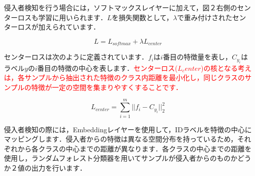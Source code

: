 \documentclass[dvipdfmx]{jsarticle}
\begin{document}
\begin{enumerate}
侵入者検知を行う場合には，ソフトマックスレイヤーに加えて，図２右側のセンターロスも学習に用いられます．$L$を損失関数として，$\lambda$で重み付けされたセンターロスが加えられています．

\begin{equation}
L = L_{softmax} + \lambda L_{center}
\end{equation}

センターロスは次のように定義されています．$f_i$は$i$番目の特徴量を表し，$C_{y_i}$はラベル$y$の$i$番目の特徴の中心を表します．\textcolor{red}{センターロス($L_center$)の核となる考えは，各サンプルから抽出された特徴のクラス内距離を最小化し，同じクラスのサンプルの特徴が一定の空間を集まりやすくすることです．}

\begin{equation}\label{}
L_{center} = \sum_{i=1}^{m} ||f_i - C_{y_i}||_2^2
\end{equation}

侵入者検知の際には，Embeddingレイヤーを使用して，IDラベルを特徴の中心にマッピングします．侵入者からの特徴は異なる空間分布を持っているため，それぞれから各クラスの中心までの距離が異なります．各クラスの中心までの距離を使用し，ランダムフォレスト分類器を用いてサンプルが侵入者からのものかどうか２値の出力を行います．

\end{enumerate}
\end{document}

